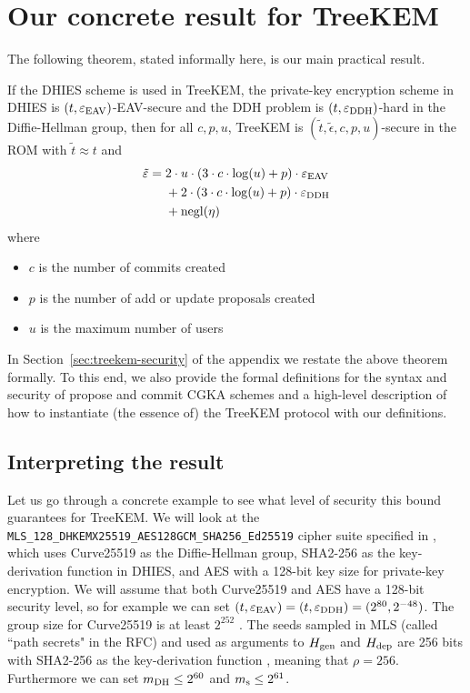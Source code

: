 \section{Our concrete result for TreeKEM}

The following theorem, stated informally here, is our main practical result.

\begin{theorem}[Informal] \label{theorem:treekem-security-informal}
	If the DHIES scheme is used in TreeKEM, the private-key encryption scheme in DHIES is $(t, \varepsilon_\mathrm{EAV})$-EAV-secure and the DDH problem is $(t, \varepsilon_\mathrm{DDH})$-hard in the Diffie-Hellman group, then for all $c, p, u$, TreeKEM is $(\tilde{t}, \tilde{\epsilon}, c, p, u)$-secure in the ROM with $\tilde{t} \approx t$ and
	\begin{align*}
		\begin{split}
			\tilde{\varepsilon} ={} & 2 \cdot u \cdot (3 \cdot c \cdot \log(u) + p) \cdot \varepsilon_\mathrm{EAV} \\
			& + 2 \cdot (3 \cdot c \cdot \log(u) + p) \cdot \varepsilon_\mathrm{DDH} \\
			& + \mathrm{negl}(\eta)
		\end{split}
	\end{align*}
	where
	\begin{itemize}
		\item $c$ is the number of commits created
		\item $p$ is the number of add or update proposals created
		\item $u$ is the maximum number of users
	\end{itemize}
\end{theorem}

In Section~\ref{sec:treekem-security} of the appendix we restate the above theorem formally. To this end, we also provide the formal definitions for the syntax and security of propose and commit CGKA schemes and a high-level description of how to instantiate (the essence of) the TreeKEM protocol with our definitions.

\subsection{Interpreting the result}

Let us go through a concrete example to see what level of security this bound guarantees for TreeKEM. We will look at the \texttt{MLS\_128\_DHKEMX25519\_AES128GCM\_SHA256\_Ed25519} cipher suite specified in \cite[Section~17.1]{rfc9420}, which uses Curve25519 as the Diffie-Hellman group, SHA2-256 as the key-derivation function in DHIES, and AES with a 128-bit key size for private-key encryption. We will assume that both Curve25519 and AES have a 128-bit security level, so for example we can set $(t, \varepsilon_\mathrm{EAV}) = (t, \varepsilon_\mathrm{DDH}) = (2^{80}, 2^{-48})$. The group size for Curve25519 is at least $2^{252}$ \cite{curve25519}. The seeds sampled in MLS (called ``path secrets" in the RFC) and used as arguments to $H_\mathrm{gen}$ and $H_\mathrm{dep}$ are 256 bits with SHA2-256 as the key-derivation function \cite{rfc9420}, meaning that $\rho = 256$. Furthermore we can set $m_\mathrm{DH} \le 2^{60}$ and $m_\mathrm{s} \le 2^{61}$.

